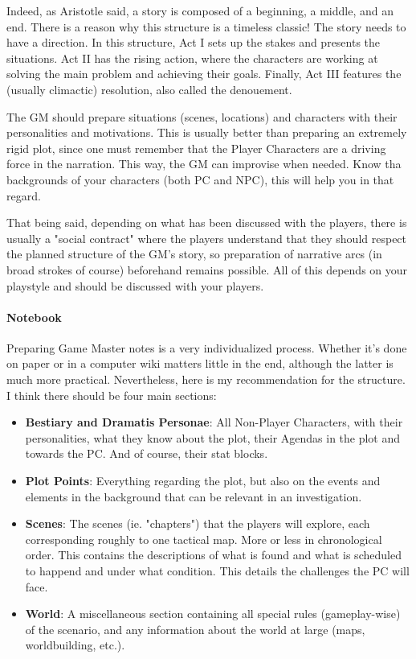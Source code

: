 Indeed, as Aristotle said, a story is composed of a beginning, a middle, and an end. There is a reason why this structure is a timeless classic! The story needs to have a direction. In this structure, Act I sets up the stakes and presents the situations. Act II has the rising action, where the characters are working at solving the main problem and achieving their goals. Finally, Act III features the (usually climactic) resolution, also called the denouement. 

The GM should prepare situations (scenes, locations) and characters with their personalities and motivations. This is usually better than preparing an extremely rigid plot, since one must remember that the Player Characters are a driving force in the narration. This way, the GM can improvise when needed. Know tha backgrounds of your characters (both PC and NPC), this will help you in that regard.

That being said, depending on what has been discussed with the players, there is usually a "social contract" where the players understand that they should respect the planned structure of the GM's story, so preparation of narrative arcs (in broad strokes of course) beforehand remains possible. All of this depends on your playstyle and should be discussed with your players.


\paragraph{Notebook}

Preparing Game Master notes is a very individualized process. Whether it's done on paper or in a computer wiki matters little in the end, although the latter is much more practical. Nevertheless, here is my recommendation for the structure. I think there should be four main sections:

\begin{itemize}
    \item \textbf{Bestiary and Dramatis Personae}: All Non-Player Characters, with their personalities, what they know about the plot, their Agendas in the plot and towards the PC. And of course, their stat blocks. 
    \item \textbf{Plot Points}: Everything regarding the plot, but also on the events and elements in the background that can be relevant in an investigation. 
    \item \textbf{Scenes}: The scenes (ie. "chapters") that the players will explore, each corresponding roughly to one tactical map. More or less in chronological order. This contains the descriptions of what is found and what is scheduled to happend and under what condition. This details the challenges the PC will face. 
    \item \textbf{World}: A miscellaneous section containing all special rules (gameplay-wise) of the scenario, and any information about the world at large (maps, worldbuilding, etc.).
\end{itemize}

